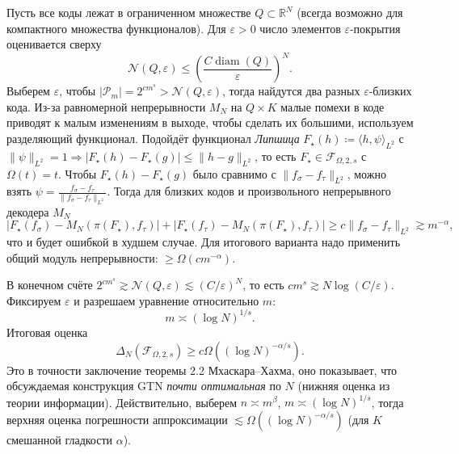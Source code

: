 \documentclass[12pt]{article}
\begin{document}
Пусть все коды лежат в ограниченном множестве \(Q \subset \mathbb{R}^N\) (всегда возможно для компактного множества функционалов).
Для \(\varepsilon > 0\) число элементов \(\varepsilon\)-покрытия оценивается сверху
\[\mathcal{N}(Q, \varepsilon) \le \left( \frac{C \operatorname{diam}(Q)}{\varepsilon} \right)^N.\]
Выберем \(\varepsilon\), чтобы \(|\mathcal{P}_m| = 2^{c m^s} > \mathcal{N}(Q, \varepsilon)\), тогда найдутся два разных \(\varepsilon\)-близких кода.
Из-за равномерной непрерывности \(M_N\) на \(Q \times K\) малые помехи в коде приводят к малым изменениям в выходе, чтобы сделать их большими, используем разделяющий функционал.
Подойдёт функционал \emph{Липшица} \(F_\star(h) \coloneq \langle h, \psi \rangle_{L^2}\) с \(\|\psi\|_{L^2} = 1 \Rightarrow |F_\star(h) - F_\star(g)| \le \|h - g\|_{L^2}\), то есть \(F_\star \in \mathcal{F}_{\Omega,2,s}\) с \(\Omega(t) = t\).
Чтобы \(F_\star(h) - F_\star(g)\) было сравнимо с \(\|f_\sigma - f_\tau\|_{L^2}\), можно взять \(\psi = \frac{f_\sigma - f_\tau}{\|f_\sigma - f_\tau\|_{L^2}}\).
Тогда для близких кодов и произвольного непрерывного декодера \(M_N\)
\[|F_\star(f_\sigma) - M_N(\pi(F_\star), f_\tau)| + |F_\star(f_\tau) - M_N(\pi(F_\star), f_\tau)| \ge c \|f_\sigma - f_\tau\|_{L^2} \gtrsim m^{-\alpha},\]
что и будет ошибкой в худшем случае.
Для итогового варианта надо применить общий модуль непрерывности: \(\geq \Omega(c m^{-\alpha})\).

В конечном счёте \(2^{c m^s} \gtrsim \mathcal{N}(Q, \varepsilon) \lesssim (C / \varepsilon)^N\), то есть \(c m^s \gtrsim N \log(C / \varepsilon)\).
Фиксируем \(\varepsilon\) и разрешаем уравнение относительно \(m\):
\[m \asymp (\log N)^{1/s}.\]
Итоговая оценка
\[\Delta_N(\mathcal{F}_{\Omega,2,s}) \ge c \Omega\left( (\log N)^{-\alpha/s} \right).\]
Это в точности заключение теоремы 2.2 Мхаскара--Хахма, оно показывает, что обсуждаемая конструкция GTN \emph{почти оптимальная} по \(N\) (нижняя оценка из теории информации).
Действительно, выберем \(n \asymp m^\beta\), \(m \asymp (\log N)^{1/s}\), тогда верхняя оценка погрешности аппроксимации \(\lesssim \Omega\left( (\log N)^{-\alpha/s} \right)\) (для \(K\) смешанной гладкости \(\alpha\)).
\end{document}
